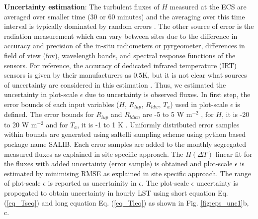 \documentclass[fleqn,10pt]{wlscirep}
\begin{document}
{\textbf{Uncertainty estimation}:
The turbulent fluxes of $H$ measured at the ECS are averaged over smaller time (30 or 60 minutes) and the averaging over this time interval is typically dominated by random errors \cite{rannik2016random, mauder2020surface}. The other source of error is the radiation measurement which can vary between sites due to the difference in accuracy and precision of the in-situ radiometers or pyrgeometer, differences in field of view (fov), wavelength bands, and spectral response functions of the sensors. For reference, the accuracy of dedicated infrared temperature (IRT) sensors is given by their manufacturers as $0.5$K, but it is not clear what sources of uncertainty are considered in this estimation \cite{vickers2010uncertainty}. Thus, we estimated the uncertainty in plot-scale $\epsilon$ due to uncertainty is observed fluxes. In first step, the error bounds of each input variables ($ H$, $R_{lup}$, $R_{ldw}$, $T_{a}$) used in plot-scale $\epsilon$ is defined. The error bounds for $R_{lup}$ and $R_{ldwn}$ are -5 to 5 W m$^{-2}$ \cite{trenberth2012tracking}, for $H$, it is -20 to 20 W m$^{-2}$ and for $T_{a}$, it is -1 to 1 K \cite{foken2008energy}. Uniformly distributed error samples within bounds are generated using saltelli sampling scheme\cite{saltelli2017new} using python based package name SALIB. Each error samples are added to the monthly segregated measured fluxes as explained in site specific approach. The $H(\Delta T)$ linear fit for the fluxes with added uncertainty (error sample) is obtained and plot-scale $\epsilon$ is estimated by minimising RMSE as explained in site specific approach. The range of plot-scale $\epsilon$ is reported as uncertainity in $\epsilon$. The plot-scale $\epsilon$ uncertainty is propogated to obtain uncertainty in hourly LST using short equation Eq. (\ref{eq_Tseq}) and long equation Eq. (\ref{eq_Tleq}) as shown in Fig. \ref{fig:eps_unc1}b, c. 

}
\end{document}
